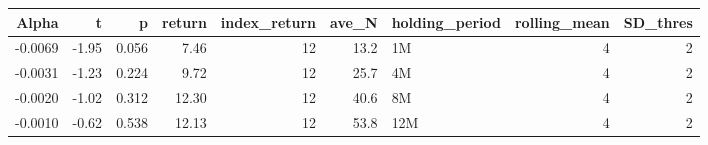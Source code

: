 \begin{table}[ht]
\centering
\begin{tabular}{rrrrrrlrr}
  \hline
Alpha & t & p & return & index\_return & ave\_N & holding\_period & rolling\_mean & SD\_thres \\ 
  \hline
-0.0069 & -1.95 & 0.056 & 7.46 & 12 & 13.2 & 1M &  4 &  2 \\ 
  -0.0031 & -1.23 & 0.224 & 9.72 & 12 & 25.7 & 4M &  4 &  2 \\ 
  -0.0020 & -1.02 & 0.312 & 12.30 & 12 & 40.6 & 8M &  4 &  2 \\ 
  -0.0010 & -0.62 & 0.538 & 12.13 & 12 & 53.8 & 12M &  4 &  2 \\ 
   \hline
\end{tabular}
\end{table}


